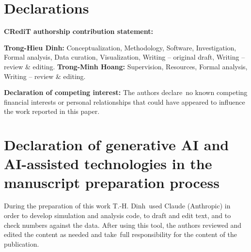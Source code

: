 \documentclass[preprint,12pt]{elsarticle}
\begin{document}
\section*{Declarations}
\textbf{CRediT authorship contribution statement:}

\textbf{Trong-Hieu Dinh:} Conceptualization, Methodology, Software, Investigation, Formal analysis, Data curation, Visualization, Writing -- original draft, Writing -- review \& editing.
\textbf{Trong-Minh Hoang:} Supervision, Resources, Formal analysis, Writing -- review \& editing.


\textbf{Declaration of competing interest:}  The authors declare\ no known competing financial interests or personal relationships that could have appeared to influence the work reported in this paper.


\section*{Declaration of generative AI and AI-assisted technologies in the manuscript preparation process}
During the preparation of this work  T.-H. Dinh\ used Claude (Anthropic) in order to develop simulation and analysis code, to draft and edit text, and to check numbers against the data. After using this tool,  the authors reviewed and edited the content as needed and take\ full responsibility for the content of the publication.



\end{document}
